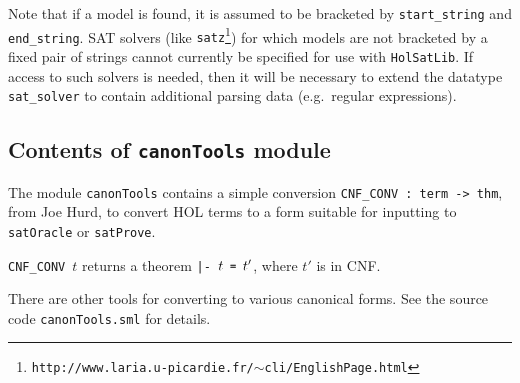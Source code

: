 \documentclass[12pt]{article}
\renewcommand{\t}[1]{\mbox{\small\tt #1}}
\newcommand\HOL{HOL\xspace}
\begin{document}
\medskip

Note that if a model is found, it is assumed to be bracketed
by \t{start\_string} and \t{end\_string}. SAT solvers 
(like {\tt satz}\footnote{\tt http://www.laria.u-picardie.fr/\mbox{\small$\sim$}cli/EnglishPage.html})
for which models are not bracketed by a fixed pair of strings cannot currently
be specified for use with {\tt HolSatLib}. If access to such solvers is needed, then
it will be necessary to extend the datatype \t{sat\_solver} to contain
additional parsing data (e.g.~regular expressions).

\subsection{Contents of {\tt canonTools} module}

The module {\tt canonTools} contains a simple conversion 
{\small\verb+CNF_CONV : term -> thm+}, 
from Joe Hurd, to convert
\HOL terms to a form suitable for inputting to \t{satOracle} or \t{satProve}.

{\small\verb+CNF_CONV+}~$t$ returns a theorem {\small\verb+|- +}$t\t{~=~}t'$,
where $t'$ is in CNF.

There are other tools for converting to various canonical forms. See the source code
{\small\verb+canonTools.sml+} for details.
\end{document}
